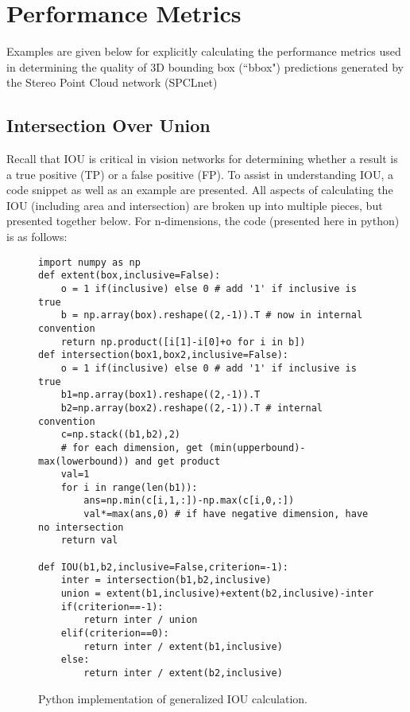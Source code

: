 \section{Performance Metrics}
\label{appendix_metrics}

Examples are given below for explicitly calculating the performance metrics used in determining the quality of 3D bounding box (``bbox") predictions generated by the Stereo Point Cloud network (SPCLnet)

\subsection{Intersection Over Union}
Recall that IOU is critical in vision networks for determining whether a result is a true positive (TP) or a false positive (FP). To assist in understanding IOU, a code snippet as well as an example are presented. All aspects of calculating the IOU (including area and intersection) are broken up into multiple pieces, but presented together below. For n-dimensions, the code (presented here in python) is as follows:

\begin{figure}[ht]
\begin{lstlisting}
import numpy as np
def extent(box,inclusive=False):
    o = 1 if(inclusive) else 0 # add '1' if inclusive is true
    b = np.array(box).reshape((2,-1)).T # now in internal convention
    return np.product([i[1]-i[0]+o for i in b])
def intersection(box1,box2,inclusive=False):
    o = 1 if(inclusive) else 0 # add '1' if inclusive is true
    b1=np.array(box1).reshape((2,-1)).T
    b2=np.array(box2).reshape((2,-1)).T # internal convention
    c=np.stack((b1,b2),2)
    # for each dimension, get (min(upperbound)-max(lowerbound)) and get product
    val=1
    for i in range(len(b1)):
        ans=np.min(c[i,1,:])-np.max(c[i,0,:])
        val*=max(ans,0) # if have negative dimension, have no intersection
    return val

def IOU(b1,b2,inclusive=False,criterion=-1):
    inter = intersection(b1,b2,inclusive)
    union = extent(b1,inclusive)+extent(b2,inclusive)-inter
    if(criterion==-1):
        return inter / union
    elif(criterion==0):
        return inter / extent(b1,inclusive)
    else:
        return inter / extent(b2,inclusive)

\end{lstlisting}
\onehalfspacing %
\caption{Python implementation of generalized IOU calculation.}
\label{code_iou}
\end{figure}

